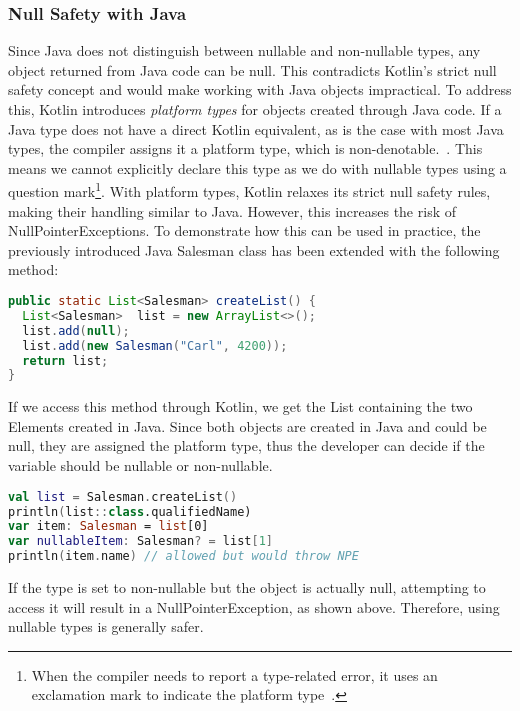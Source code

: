 \documentclass[a4paper,11pt]{article}
\begin{document}
\subsubsection{Null Safety with Java}
Since Java does not distinguish between nullable and non-nullable types, any object returned from Java code can be null. This contradicts Kotlin's strict null safety concept and would make working with Java objects impractical.
To address this, Kotlin introduces \textit{platform types} for objects created through Java code. If a Java type does not have a direct Kotlin equivalent, as is the case with most Java types, the compiler assigns it a platform type, which is non-denotable.~\cite{interop-null-safety}. This means we cannot explicitly declare this type as we do with nullable types using a question mark\footnote{When the compiler needs to report a type-related error, it uses an exclamation mark to indicate the platform type~\cite{interop-platform-notation}.}. With platform types, Kotlin relaxes its strict null safety rules, making their handling similar to Java. However, this increases the risk of NullPointerExceptions.
To demonstrate how this can be used in practice, the previously introduced Java Salesman class has been extended with the following method:
\begin{lstlisting}[language=Java]
public static List<Salesman> createList() {
  List<Salesman>  list = new ArrayList<>();
  list.add(null);
  list.add(new Salesman("Carl", 4200));
  return list;
}
\end{lstlisting}
If we access this method through Kotlin, we get the List containing the two Elements created in Java. Since both objects are created in Java and could be null, they are assigned the platform type, thus the developer can decide if the variable should be nullable or non-nullable.
\begin{lstlisting}[language=Kotlin]  
val list = Salesman.createList()
println(list::class.qualifiedName)
var item: Salesman = list[0]
var nullableItem: Salesman? = list[1]
println(item.name) // allowed but would throw NPE
\end{lstlisting}
If the type is set to non-nullable but the object is actually null, attempting to access it will result in a NullPointerException, as shown above. Therefore, using nullable types is generally safer.
\end{document}
